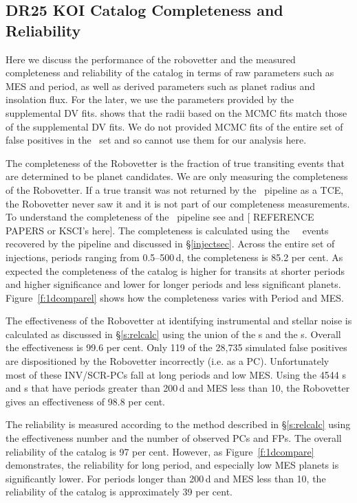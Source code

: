 \subsection{DR25 KOI Catalog Completeness and Reliability}
\label{s:candr}
Here we discuss the performance of the robovetter and the measured completeness and reliability of the catalog in terms of raw parameters such as MES and period, as well as derived parameters such as planet radius and insolation flux.  For the later, we use the parameters provided by the supplemental DV fits.  \citet{Christiansen2017} shows that the radii based on the MCMC fits match those of the supplemental DV fits. We do not provided MCMC fits of the entire set of false positives in the \opstce\ set and so cannot use them for our analysis here.


The completeness of the Robovetter is the fraction of true transiting events that are determined to be planet candidates.  We are only measuring the completeness of the Robovetter. If a true transit was not returned by the \Kepler\ pipeline as a TCE, the Robovetter never saw it and it is not part of our completeness measurements. To understand the completeness of the \Kepler\ pipeline see \citet{Christiansen2017} and \citet{Burke2017} [ REFERENCE PAPERS or KSCI's here].  The completeness is calculated using the \ninjtces\ \injtce\ events recovered by the pipeline and discussed in \S\ref{injectsec}.  Across the entire set of injections, periods ranging from 0.5--500\,d, the completeness is 85.2 per cent. As expected the completeness of the catalog is higher for transits at shorter periods and higher significance and lower for longer periods and less significant planets. Figure~\ref{f:1dcomparel} shows how the completeness varies with Period and MES. 

The effectiveness of the Robovetter at identifying instrumental and stellar noise is calculated as discussed in \S\ref{s:relcalc} using the union of the \invtce s and the \scrtce s. Overall the effectiveness is 99.6 per cent.  Only 119 of the 28,735 simulated false positives are dispositioned by the Robovetter incorrectly (i.e. as a PC).  Unfortunately most of these INV/SCR-PCs fall at long periods and low MES.
Using the 4544 \invtce s and \scrtce s that have periods greater than 200\,d and MES less than 10, the Robovetter gives an effectiveness of 98.8 per cent.

The reliability is measured according to the method described in \S\ref{s:relcalc} using the effectiveness number and the number of observed PCs and FPs.  The overall reliability of the catalog is 97 per cent. However, as Figure~\ref{f:1dcompare} demonstrates, the reliability for long period, and especially low MES planets is significantly lower.  For periods longer than 200\,d and MES less than 10, the reliability of the catalog is approximately 39 per cent.

